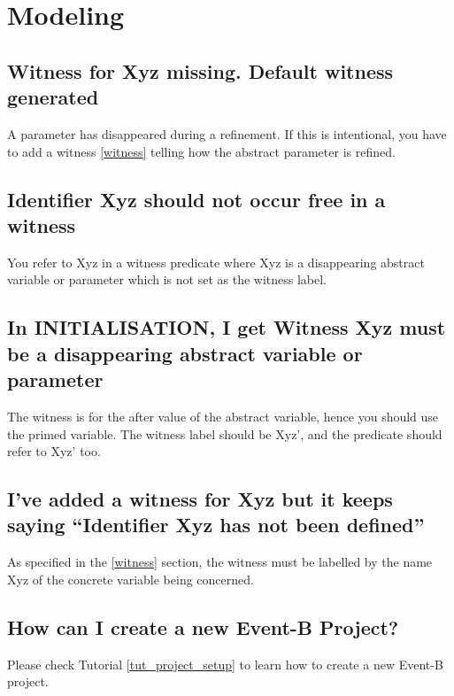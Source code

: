 \section{Modeling}

\subsection{Witness for \textsf{Xyz} missing. Default witness generated}

A parameter has disappeared during a refinement. If this is intentional, you have to add a witness \ref{witness} telling how the abstract parameter is refined. 

\subsection{Identifier \textsf{Xyz} should not occur free in a witness}

You refer to \textsf{Xyz} in a witness predicate where \textsf{Xyz} is a disappearing abstract variable or parameter which is not set as the witness label. 

\subsection{In \textsf{INITIALISATION}, I get Witness \textsf{Xyz} must be a disappearing abstract variable or parameter}

The witness is for the after value of the abstract variable, hence you should use the primed variable. The witness label should be \textsf{Xyz'}, and the predicate should refer to \textsf{Xyz'} too. 

\subsection{I've added a witness for \textsf{Xyz} but it keeps saying ``Identifier \textsf{Xyz} has not been defined''}

As specified in the \ref{witness} section, the witness must be labelled by the name \textsf{Xyz} of the concrete variable being concerned.

\subsection{How can I create a new Event-B Project?}

Please check Tutorial \ref{tut_project_setup} to learn how to create a new Event-B project.

